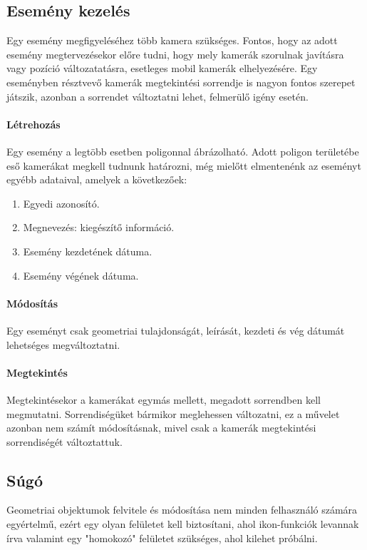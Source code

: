 \subsection{Esemény kezelés} %
\label{sub:esemény_kezelés}
  Egy esemény megfigyeléséhez több kamera szükséges. Fontos, hogy az adott esemény megtervezésekor előre tudni, hogy mely kamerák szorulnak javításra vagy pozíció változatatásra, esetleges mobil kamerák elhelyezésére.
  Egy eseményben résztvevő kamerák megtekintési sorrendje is nagyon fontos szerepet játszik, azonban a sorrendet változtatni lehet, felmerülő igény esetén.
  
  
  \paragraph{Létrehozás}
  Egy esemény a legtöbb esetben poligonnal ábrázolható. Adott poligon területébe eső kamerákat megkell tudnunk határozni, még mielőtt elmentenénk az eseményt egyébb adataival, amelyek a következőek:
  \begin{enumerate}
    \item Egyedi azonosító.
    \item Megnevezés: kiegészítő információ.
    \item Esemény kezdetének dátuma.
    \item Esemény végének dátuma.
  \end{enumerate}

  \paragraph{Módosítás}
  Egy eseményt csak geometriai tulajdonságát, leírását, kezdeti és vég dátumát lehetséges megváltoztatni.
  
  \paragraph{Megtekintés}
  Megtekintésekor a kamerákat egymás mellett, megadott sorrendben kell megmutatni. Sorrendiségüket bármikor meglehessen változatni, ez a művelet azonban nem számít módosításnak, mivel csak a kamerák megtekintési sorrendiségét változtattuk.

\subsection{Súgó} %
\label{sub:súgó}
  Geometriai objektumok felvitele és módosítása nem minden felhasználó számára egyértelmű, ezért egy olyan felületet kell biztosítani, ahol ikon-funkciók levannak írva valamint egy "homokozó" felületet szükséges, ahol kilehet próbálni.
  

